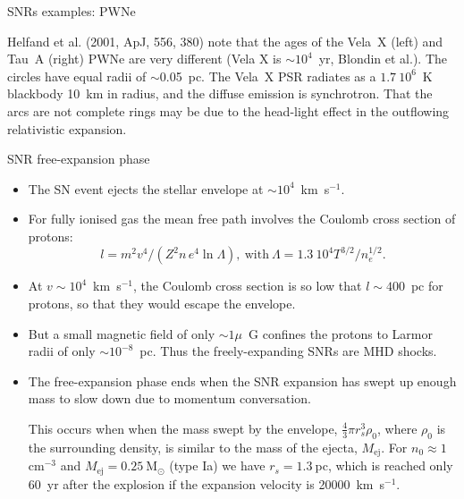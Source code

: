 \begin{frame}{SNRs examples: PWNe}
\begin{minipage}[t]{0.54\textwidth}
\begin{center}
    \end{center}
\end{minipage}
Helfand et al. (2001, ApJ, 556, 380) note that the ages of the Vela~X
(left) and Tau~A (right) PWNe are very different (Vela X is $\sim
10^4$~yr, Blondin et al.). The circles have equal radii of
$\sim$0.05~pc. The Vela~X PSR radiates as a $1.7~10^6$~K blackbody
10~km in radius, and the diffuse emission is synchrotron. That the
arcs are not complete rings may be due to the head-light effect in the
outflowing relativistic expansion.

\end{frame}






\begin{frame}{SNR free-expansion phase}


\begin{itemize}

\item The SN event ejects the stellar envelope at $\sim
  10^4$~km~s$^{-1}$. 

\item For fully ionised gas the mean free path involves the Coulomb
  cross section of protons:
\begin{equation}
  l = m^2 v^4 / (Z^2 n\, e^4  \ln \Lambda ), ~\text{with} ~\Lambda =
1.3~10^4 T^{3/2} / n_e^{1/2}.  \label{eq:coulombfreepath}
\end{equation}

\item At $v\sim 10^4$~km~s$^{-1}$, the Coulomb cross section is so low
  that $l \sim 400$~pc for protons, so that they would escape the
  envelope. 

\item But a small magnetic field of only $\sim 1\mu$~G confines the
protons to Larmor radii of only $\sim 10^{-8}$~pc. Thus the
freely-expanding SNRs are MHD shocks.

\item The free-expansion phase ends when the SNR expansion has swept
  up enough mass to slow down due to momentum conversation. 

This occurs when when the mass swept by the envelope, $\frac{4}{3}\pi
r_s^3 \rho_0$, where $\rho_0$ is the surrounding density, is similar
to the mass of the ejecta, $M_\mathrm{ej}$. For $n_0 \approx
1~$cm$^{-3}$ and $M_\mathrm{ej} = 0.25~$M$_\odot$ (type Ia) we have
$r_s = 1.3~$pc, which is reached only 60~yr after the explosion if the
expansion velocity is 20000~km~s$^{-1}$.


\end{itemize}


\end{frame}






